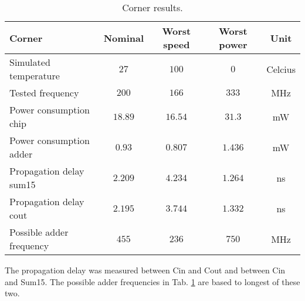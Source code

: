 \begin{table}[H]
	\caption{Corner results.}
	\centering
	\begin{tabular}{| l | c | c | c | c |}
		\hline
		Corner & Nominal & Worst speed & Worst power & Unit\\
		\hline
		Simulated temperature & $27$ & $100$ & $0$ & Celcius\\
		\hline 
		Tested frequency & $200$ & $166$ & $333$ & MHz  \\
		\hline
		Power consumption chip & $18.89$ & $16.54$ & $31.3$ & mW \\
		\hline 
		Power consumption adder & $0.93$ & $0.807$ & $1.436$ & mW \\
		\hline 
		Propagation delay sum15 & $2.209$ & $4.234$ & $1.264$ & ns \\
		\hline 
		Propagation delay cout & $2.195$ & $3.744$ & $1.332$ & ns \\
		\hline
		Possible adder frequency & $455$ & $236$ & $750$ & MHz \\
		\hline
	\end{tabular}
	\label{corner_result}
\end{table}

The propagation delay was measured between Cin and Cout and between Cin and Sum15. The possible adder frequencies in Tab. \ref{corner_result} are based to longest of these two.






